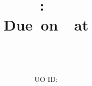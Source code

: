 \usepackage{extramarks}
\usepackage{multicol}
\usepackage{adjustbox}


\def\type{problem}

\topmargin=-0.45in
\evensidemargin=0in
\oddsidemargin=0in
\textwidth=6.5in
\textheight=9.0in
\headsep=0.25in

\linespread{1.1}

\renewcommand\headrulewidth{0.4pt}
\renewcommand\footrulewidth{0.4pt}

\pagestyle{fancy}

\makeatletter
\def\removeSpaces#1{\zap@space#1 \@empty}

\fancyhead[L]{\hmwkAuthorName}
\fancyhead[C]{\hwkClassShort: \hmwkClass}
\fancyhead[R]{\hmwkTitle: \hmwkClassInstructorShortName}
\fancyfoot[L]{\lastxmark}
\fancyfoot[C]{\thepage}
\fancyfoot[R]{}

\title{
  \vspace{2in}\textmd{\textmd{\textbf{\hmwkClass:\ \hmwkTitle}}} \\
  \normalsize\vspace{0.1in}\small{Due\ on\ \hmwkDueDate\ at \hmwkDueTime} \\
  \vspace{0.1in}\large{\textit{\hmwkClassInstructor\ \hmwkClassTime}}\vspace{3in}
}

\author{\hmwkAuthorName\\[-1em] \small{UO ID: \uoID}}
\date{}
\makeatother

\renewenvironment{problem}[1][-1]{\ifthenelse{\equal{\type}{problem}}{\ifthenelse{\equal{#1}{-1}}{\noindent\textbf{Problem}.~}{\noindent\textbf{Problem~#1}.}}{\ifthenelse{\equal{#1}{-1}}{\noindent\textbf{Exercise}.~}{\noindent\textbf{Exercise #1}.}}}{}

\newcommand\createtitlepage[2]{
  \newcommand\hmwkTitle{#1}
  \newcommand\hmwkDueDate{#2}
  \maketitle
  \pagestyle{plain}
  \mbox{}\newpage
  \pagestyle{fancy}
  \setcounter{page}{1}
}

